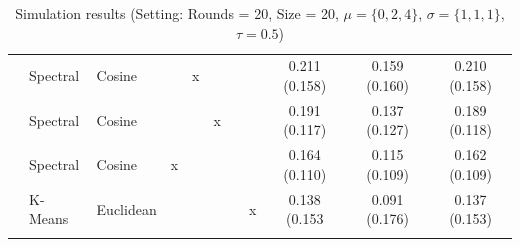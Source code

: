 \documentclass[12pt,a4paper,bibliography=totocnumbered,listof=totocnumbered]{scrartcl}
\begin{document}
{\begin{appendix}
\begin{table}[H]
\begin{tabularx}{\textwidth}{ lllcccccccc}
	& Spectral & Cosine &  & x &  &  &  & 0.211 (0.158) & 0.159 (0.160) & 0.210 (0.158) \\ 
	& Spectral & Cosine &  &  & x &  &  & 0.191 (0.117) & 0.137 (0.127) & 0.189 (0.118) \\ 
	& Spectral & Cosine & x &  &  &  &  & 0.164 (0.110) & 0.115 (0.109) & 0.162 (0.109) \\ 
	& K-Means & Euclidean &  &  &  &  & x & 0.138 (0.153 & 0.091 (0.176) & 0.137 (0.153) \\
	\hline \\[-1.8ex] 
	\end{tabularx} 
	\caption{Simulation results (Setting: Rounds = 20, Size = 20, $\mu = \{0,2,4\}$, $\sigma =  \{1,1,1\}$, $\tau = 0.5$)} 
		\label{tab:apstab7}
\end{table} 


\end{appendix}}
\end{document}
